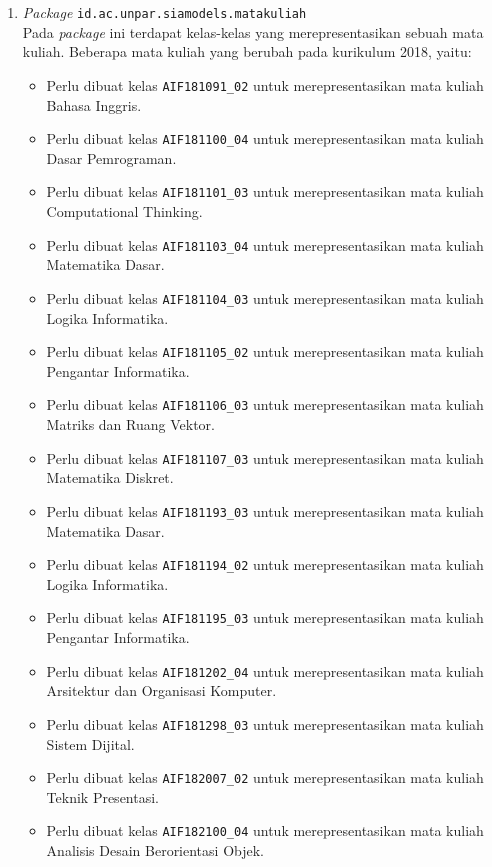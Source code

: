 \documentclass[a4paper,twoside]{article}
\begin{document}
\begin{enumerate}
\begin{enumerate}
\begin{enumerate}
				\item \textit{Package} \texttt{id.ac.unpar.siamodels.matakuliah} \\
				Pada \textit{package} ini terdapat kelas-kelas yang merepresentasikan sebuah mata kuliah. Beberapa mata kuliah yang berubah pada kurikulum 2018, yaitu:
				\begin{itemize}
					\item Perlu dibuat kelas \texttt{AIF181091\_02} untuk merepresentasikan mata kuliah Bahasa Inggris.
					\item Perlu dibuat kelas \texttt{AIF181100\_04} untuk merepresentasikan mata kuliah Dasar Pemrograman.
					\item Perlu dibuat kelas \texttt{AIF181101\_03} untuk merepresentasikan mata kuliah Computational Thinking.
					\item Perlu dibuat kelas \texttt{AIF181103\_04} untuk merepresentasikan mata kuliah Matematika Dasar.
					\item Perlu dibuat kelas \texttt{AIF181104\_03} untuk merepresentasikan mata kuliah Logika Informatika.
					\item Perlu dibuat kelas \texttt{AIF181105\_02} untuk merepresentasikan mata kuliah Pengantar Informatika.
					\item Perlu dibuat kelas \texttt{AIF181106\_03} untuk merepresentasikan mata kuliah Matriks dan Ruang Vektor.
					\item Perlu dibuat kelas \texttt{AIF181107\_03} untuk merepresentasikan mata kuliah Matematika Diskret.
					\item Perlu dibuat kelas \texttt{AIF181193\_03} untuk merepresentasikan mata kuliah Matematika Dasar.
					\item Perlu dibuat kelas \texttt{AIF181194\_02} untuk merepresentasikan mata kuliah Logika Informatika.
					\item Perlu dibuat kelas \texttt{AIF181195\_03} untuk merepresentasikan mata kuliah Pengantar Informatika.
					\item Perlu dibuat kelas \texttt{AIF181202\_04} untuk merepresentasikan mata kuliah Arsitektur dan Organisasi Komputer.
					\item Perlu dibuat kelas \texttt{AIF181298\_03} untuk merepresentasikan mata kuliah Sistem Dijital.
					\item Perlu dibuat kelas \texttt{AIF182007\_02} untuk merepresentasikan mata kuliah Teknik Presentasi.
					\item Perlu dibuat kelas \texttt{AIF182100\_04} untuk merepresentasikan mata kuliah Analisis Desain Berorientasi Objek.

\end{itemize}
\end{enumerate}
\end{enumerate}
\end{enumerate}
\end{document}
